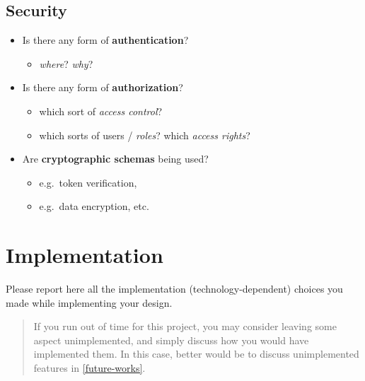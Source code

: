 \documentclass{scrartcl}
\begin{document}
\subsection{Security}\label{security}

\begin{itemize}
  \item Is there any form of \textbf{authentication}?
  \begin{itemize}
    \item \emph{where}? \emph{why}?
  \end{itemize}

  \item Is there any form of \textbf{authorization}?
  \begin{itemize}
    \item which sort of \emph{access control}?
    \item which sorts of users / \emph{roles}? which \emph{access rights}?
  \end{itemize}

  \item Are \textbf{cryptographic schemas} being used?
  \begin{itemize}
    \item e.g.~token verification,
    \item e.g.~data encryption, etc.
  \end{itemize}
\end{itemize}

\section{Implementation}\label{implementation}

Please report here all the implementation (technology-dependent) choices you made while implementing your design.

\begin{quote}
  If you run out of time for this project, you may consider leaving some aspect unimplemented, 
  and simply discuss how you would have implemented them.
  In this case, better would be to discuss unimplemented features in \cref{future-works}.
\end{quote}
\end{document}
